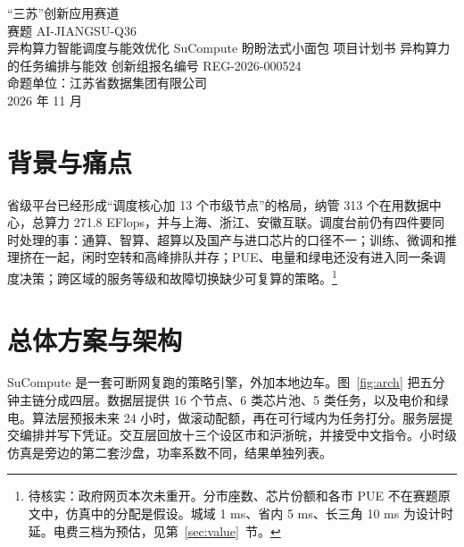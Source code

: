 

\contesttitlepage
  {“三苏”创新应用赛道\\赛题 AI-JIANGSU-Q36\\异构算力智能调度与能效优化}
  {SuCompute}
  {盼盼法式小面包}
  {项目计划书}
  {异构算力的任务编排与能效}
  {创新组\quad 报名编号 REG-2026-000524\\命题单位：江苏省数据集团有限公司\\2026 年 11 月}

\begin{abstract}
SuCompute 在同一合成周上编排异构任务，并给出边车建议和任务凭证。种子 313、四场景等权的结果是：有效在线利用率 80.01\%，服务等级 99.83\%，相对轮询就近的单位能耗降低 21.23\%。
\end{abstract}

\section{背景与痛点}
省级平台已经形成“调度核心加 13 个市级节点”的格局，纳管 313 个在用数据中心，总算力 271.8 EFlops，并与上海、浙江、安徽互联。调度台前仍有四件要同时处理的事：通算、智算、超算以及国产与进口芯片的口径不一；训练、微调和推理挤在一起，闲时空转和高峰排队并存；PUE、电量和绿电还没有进入同一条调度决策；跨区域的服务等级和故障切换缺少可复算的策略。\footnote{待核实：政府网页本次未重开。分市座数、芯片份额和各市 PUE 不在赛题原文中，仿真中的分配是假设。城域 1 ms、省内 5 ms、长三角 10 ms 为设计时延。电费三档为预估，见第~\ref{sec:value}~节。}

\section{总体方案与架构}
SuCompute 是一套可断网复跑的策略引擎，外加本地边车。图~\ref{fig:arch} 把五分钟主链分成四层。数据层提供 16 个节点、6 类芯片池、5 类任务，以及电价和绿电。算法层预报未来 24 小时，做滚动配额，再在可行域内为任务打分。服务层提交编排并写下凭证。交互层回放十三个设区市和沪浙皖，并接受中文指令。小时级仿真是旁边的第二套沙盘，功率系数不同，结果单独列表。

